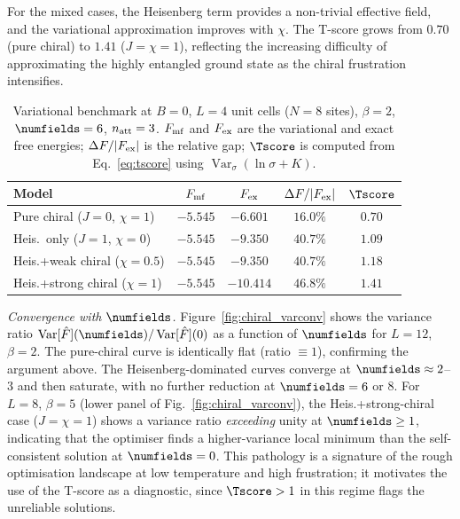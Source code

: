 For the mixed cases, the Heisenberg term provides a non-trivial effective
field, and the variational approximation improves with $\chi$.
The T-score grows from $0.70$ (pure chiral) to $1.41$ ($J=\chi=1$),
reflecting the increasing difficulty of approximating the highly entangled
ground state as the chiral frustration intensifies.

\begin{table}[h]
  \centering
  \caption{Variational benchmark at $B=0$, $L=4$ unit cells ($N=8$ sites),
           $\beta=2$, $\numfields=6$, $n_{\rm att}=3$.
           $F_{\rm mf}$ and $F_{\rm ex}$ are the variational and exact free
           energies; $\Delta F/|F_{\rm ex}|$ is the relative gap;
           $\Tscore$ is computed from
           Eq.~\eqref{eq:tscore} using $\operatorname{Var}_\sigma(\ln\sigma+K)$.}
  \label{tab:chiral_exact}
  \begin{tabular}{lcccc}
    \hline\hline
    Model & $F_{\rm mf}$ & $F_{\rm ex}$ &
            $\Delta F / |F_{\rm ex}|$ & $\Tscore$ \\
    \hline
    Pure chiral ($J=0$, $\chi=1$)  & $-5.545$ & $-6.601$ & $16.0\%$ & $0.70$ \\
    Heis.\ only ($J=1$, $\chi=0$)  & $-5.545$ & $-9.350$ & $40.7\%$ & $1.09$ \\
    Heis.+weak chiral ($\chi=0.5$) & $-5.545$ & $-9.350$ & $40.7\%$ & $1.18$ \\
    Heis.+strong chiral ($\chi=1$) & $-5.545$ & $-10.414$ & $46.8\%$ & $1.41$ \\
    \hline\hline
  \end{tabular}
\end{table}

\textit{Convergence with $\numfields$.}
Figure~\ref{fig:chiral_varconv} shows the variance ratio
$\operatorname{Var}[\hat{F}](\numfields)/\operatorname{Var}[\hat{F}](0)$
as a function of $\numfields$ for $L=12$, $\beta=2$.
The pure-chiral curve is identically flat (ratio $\equiv 1$), confirming the
argument above.
The Heisenberg-dominated curves converge at $\numfields\approx 2$--$3$
and then saturate, with no further reduction at $\numfields=6$ or $8$.
For $L=8$, $\beta=5$ (lower panel of Fig.~\ref{fig:chiral_varconv}), the
Heis.+strong-chiral case ($J=\chi=1$) shows a variance ratio \emph{exceeding}
unity at $\numfields\ge 1$, indicating that the optimiser finds a
higher-variance local minimum than the self-consistent solution at $\numfields=0$.
This pathology is a signature of the rough optimisation landscape at low
temperature and high frustration; it motivates the use of the T-score as a
diagnostic, since $\Tscore > 1$ in this regime flags the unreliable solutions.


